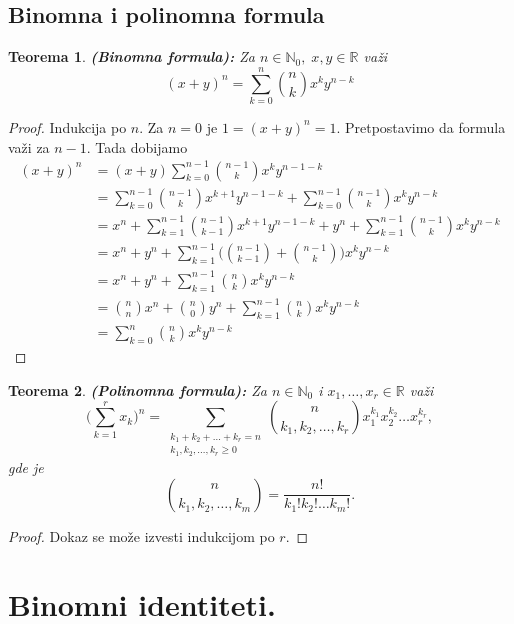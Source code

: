 \documentclass[a4paper,12pt]{article}
\numberwithin{algorithm}{section}
\theoremstyle{plain}
\newtheorem{theorem}{Teorema}[section]
\theoremstyle{definition}
\theoremstyle{remark}
\begin{document}
\subsection{Binomna i polinomna formula}
\begin{theorem}
    \textbf{(Binomna formula):} Za $n \in \mathbb{N}_0,\; x,y \in \mathbb{R}$ važi
    \[
        (x + y)^n = \sum_{k = 0}^{n} {{n} \choose k}x^k y^{n - k}
    \]
\end{theorem}
\begin{proof}
    Indukcija po $n$. Za $n = 0$ je $1 = (x+y)^n = 1$. Pretpostavimo da formula važi za $n - 1$. Tada dobijamo
    \[
        \begin{aligned}
            (x + y)^n &= (x+y) \sum_{k = 0}^{n - 1}{{n - 1} \choose k}x^k y^{n - 1 - k}\\
            &= \sum_{k = 0}^{n-1}{{n - 1} \choose k}x^{k + 1}y^{n - 1 - k} + \sum_{k = 0}^{n - 1} {{n - 1} \choose k}x^k y^{n - k} \\
            &= x^n + \sum_{k = 1}^{n-1}{{n - 1} \choose {k-1}}x^{k + 1}y^{n - 1 - k} + y^n + \sum_{k = 1}^{n - 1} {{n - 1} \choose k}x^k y^{n - k} \\
            &= x^n + y^n + \sum_{k = 1}^{n - 1}\bigg({{n - 1} \choose k-1} + {{n - 1} \choose {k}} \bigg) x^k y ^{n-k} \\
            &= x^n + y^n + \sum_{k = 1}^{n - 1}{{n} \choose k}x^k y^{n - k}\\ 
            &= {{n} \choose n} x^n + {{n} \choose 0} y^n + \sum_{k = 1}^{n - 1}{{n} \choose k}x^k y^{n - k} \\
            &= \sum_{k = 0}^{n}{{n} \choose k}x^k y^{n - k}
        \end{aligned}
    \]
\end{proof}

\begin{theorem}
    \textbf{(Polinomna formula):} Za $n \in \mathbb{N}_0$ i $x_1, \ldots, x_r \in \mathbb{R}$ važi
    \[ \bigg(\sum_{k = 1}^{r}x_k\bigg)^n = \sum_{\substack{k_1 + k_2 + \dots + k_r = n \\ k_1, k_2, \dots, k_r \geq 0}} {{n}\choose k_1, k_2, \dots, k_r} x_1^{k_1} x_2^{k_2} \dots x_r^{k_r},\]
   gde je \[ {{n}\choose k_1, k_2, \dots, k_m} = \frac{n!}{k_1! k_2! \dots k_m!}. \]
\end{theorem}
\begin{proof}
    Dokaz se može izvesti indukcijom po $r$.
\end{proof}
\newpage
\section{Binomni identiteti.}
\end{document}
